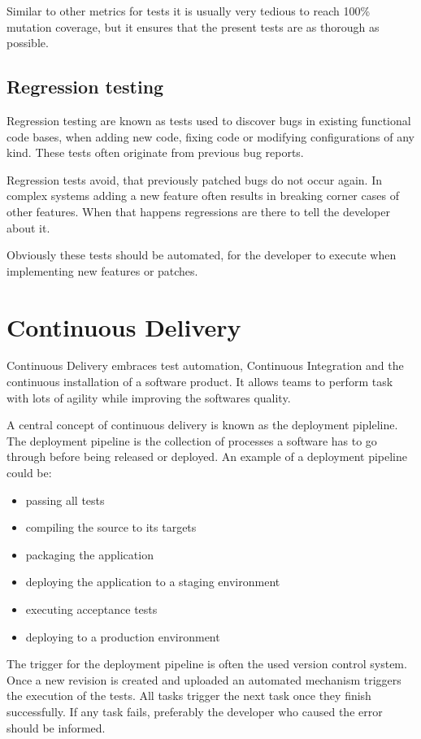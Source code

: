 Similar to other metrics for tests it is usually very tedious to reach 100\%
mutation coverage, but it ensures that the present tests are as thorough as
possible.

\subsection{Regression testing}

Regression testing are known as tests used to discover bugs in existing
functional code bases, when adding new code, fixing code or modifying
configurations of any kind. These tests often originate from previous bug
reports.

Regression tests avoid, that previously patched bugs do not occur again. In
complex systems adding a new feature often results in breaking corner cases of
other features. When that happens regressions are there to tell the developer
about it.

Obviously these tests should be automated, for the developer to execute when
implementing new features or patches.

\section{Continuous Delivery}

Continuous Delivery embraces test automation, Continuous Integration and the
continuous installation of a software product. It allows teams to perform task
with lots of agility while improving the softwares quality.

A central concept of continuous delivery is known as the deployment pipleline.
The deployment pipeline is the collection of processes a software has to go
through before being released or deployed. An example of a deployment pipeline
could be: 

\begin{itemize}
  \item{passing all tests}
  \item{compiling the source to its targets}
  \item{packaging the application}
  \item{deploying the application to a staging environment}
  \item{executing acceptance tests}
  \item{deploying to a production environment}
\end{itemize}

The trigger for the deployment pipeline is often the used version control
system. Once a new revision is created and uploaded an automated mechanism
triggers the execution of the tests. All tasks trigger the next task once they
finish successfully. If any task fails, preferably the developer who caused the
error should be informed.

